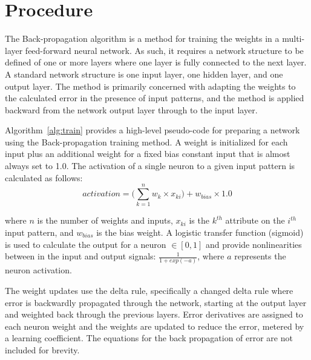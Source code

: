 \documentclass[a4paper, 11pt]{article}
\begin{document}
\section{Procedure}
\label{sec:procedure}
The Back-propagation algorithm is a method for training the weights in a multi-layer feed-forward neural network. As such, it requires a network structure to be defined of one or more layers where one layer is fully connected to the next layer. A standard network structure is one input layer, one hidden layer, and one output layer. The method is primarily concerned with adapting the weights to the calculated error in the presence of input patterns, and the method is applied backward from the network output layer through to the input layer.

Algorithm~\ref{alg:train} provides a high-level pseudo-code for preparing a network using the Back-propagation training method. A weight is initialized for each input plus an additional weight for a fixed bias constant input that is almost always set to 1.0. The activation of a single neuron to a given input pattern is calculated as follows:
\begin{equation}
	activation = \bigg(\sum_{k=1}^{n} w_{k} \times x_{ki}\bigg) + w_{bias} \times 1.0
\end{equation}

where $n$ is the number of weights and inputs, $x_{ki}$ is the $k^{th}$ attribute on the $i^{th}$ input pattern, and $w_{bias}$ is the bias weight. A logistic transfer function (sigmoid) is used to calculate the output for a neuron $\in [0,1]$ and provide nonlinearities between in the input and output signals: $\frac{1}{1+exp(-a)}$, where $a$ represents the neuron activation. 

The weight updates use the delta rule, specifically a changed delta rule where error is backwardly propagated through the network, starting at the output layer and weighted back through the previous layers. Error derivatives are assigned to each neuron weight and the weights are updated to reduce the error, metered by a learning coefficient. The equations for the back propagation of error are not included for brevity.
\end{document}
